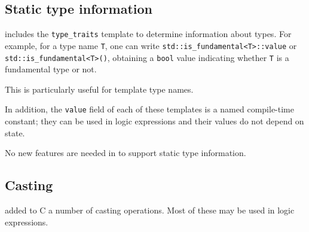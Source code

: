 \subsection{Static type information}

\lang{} includes the \lstinline|type_traits| template to determine information about types.
For example, for a type name \lstinline|T|, one can write
\lstinline|std::is_fundamental<T>::value| or
\lstinline|std::is_fundamental<T>()|, obtaining a 
\lstinline|bool| value indicating whether 
\lstinline|T| is a fundamental type or not.

This is particularly useful for template type names.

In addition, the \lstinline|value| field of each of these templates is a named \lang{} compile-time constant; they can be used in logic expressions and their values do not depend on state.

No new features are needed in \NAME{} to support static type information. 

\subsection{Casting}
\lang{} added to C a number of casting operations. Most of these may be 
used in logic expressions.

